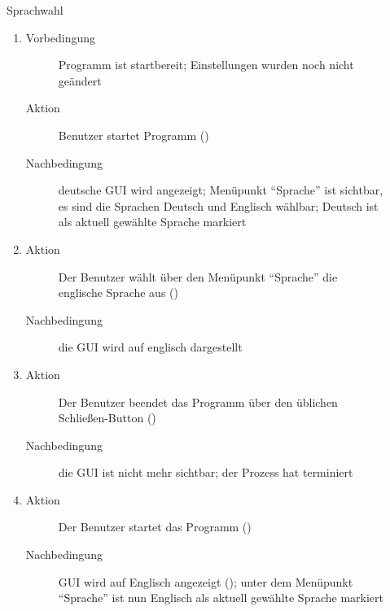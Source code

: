 \begin{description}
	\item[] Sprachwahl
	\begin{enumerate}
		\item
		\begin{description}
			\item[Vorbedingung] Programm ist startbereit; Einstellungen wurden noch nicht geändert
			\item[Aktion] Benutzer startet Programm ()
			\item[Nachbedingung] deutsche GUI wird angezeigt; Menüpunkt \enquote{Sprache} ist sichtbar, es sind die Sprachen Deutsch und Englisch wählbar; Deutsch ist als aktuell gewählte Sprache markiert
		\end{description}
		\item
		\begin{description}
			\item[Aktion] Der Benutzer wählt über den Menüpunkt \enquote{Sprache} die englische Sprache aus ()
			\item[Nachbedingung] die GUI wird auf englisch dargestellt
		\end{description}
		\item
		\begin{description}
			\item[Aktion] Der Benutzer beendet das Programm über den üblichen Schließen-Button ()
			\item[Nachbedingung] die GUI ist nicht mehr sichtbar; der Prozess hat terminiert
		\end{description}
		\item
		\begin{description}
			\item[Aktion] Der Benutzer startet das Programm ()
			\item[Nachbedingung] GUI wird auf Englisch angezeigt (); unter dem Menüpunkt \enquote{Sprache} ist nun Englisch als aktuell gewählte Sprache markiert
		\end{description}
	\end{enumerate}


\end{description}
